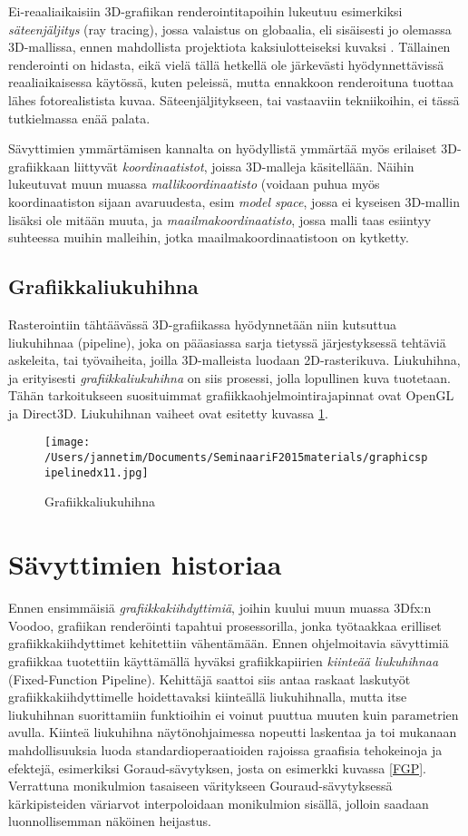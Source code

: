 \documentclass[finnish]{tktltiki2}
\theoremstyle{definition}
\theoremstyle{remark}
\begin{document}
Ei-reaaliaikaisiin 3D-grafiikan renderointitapoihin lukeutuu esimerkiksi \emph{säteenjäljitys} (ray tracing), jossa valaistus on globaalia, eli sisäisesti jo olemassa 3D-mallissa, ennen mahdollista projektiota kaksiulotteiseksi kuvaksi \cite{Puh08}. Tällainen renderointi on hidasta, eikä vielä tällä hetkellä ole järkevästi hyödynnettävissä reaaliaikaisessa käytössä, kuten peleissä, mutta ennakkoon renderoituna tuottaa lähes fotorealistista kuvaa. Säteenjäljitykseen, tai vastaaviin tekniikoihin, ei tässä tutkielmassa enää palata.

Sävyttimien ymmärtämisen kannalta on hyödyllistä ymmärtää myös erilaiset 3D-grafiikkaan liittyvät \emph{koordinaatistot}, joissa 3D-malleja käsitellään. Näihin lukeutuvat muun muassa \emph{mallikoordinaatisto} (voidaan puhua myös koordinaatiston sijaan avaruudesta, esim \emph{model space}, jossa ei kyseisen 3D-mallin lisäksi ole mitään muuta, ja \emph{maailmakoordinaatisto}, jossa malli taas esiintyy suhteessa muihin malleihin, jotka maailmakoordinaatistoon on kytketty.

\subsection{Grafiikkaliukuhihna}
Rasterointiin tähtäävässä 3D-grafiikassa hyödynnetään niin kutsuttua liukuhihnaa (pipeline), joka on pääasiassa sarja tietyssä järjestyksessä tehtäviä askeleita, tai työvaiheita, joilla 3D-malleista luodaan 2D-rasterikuva. Liukuhihna, ja erityisesti \emph{grafiikkaliukuhihna} on siis prosessi, jolla lopullinen kuva tuotetaan. Tähän tarkoitukseen suosituimmat grafiikkaohjelmointirajapinnat ovat OpenGL ja Direct3D. Liukuhihnan vaiheet ovat esitetty kuvassa \ref{gpipe}.

\begin{figure}[!htbp]
\centering
\texttt{[image: /Users/jannetim/Documents/SeminaariF2015materials/graphicspipelinedx11.jpg]}
\caption{Grafiikkaliukuhihna}
\label{gpipe}
\end{figure}

\section{Sävyttimien historiaa}

Ennen ensimmäisiä \emph{grafiikkakiihdyttimiä}, joihin kuului muun muassa 3Dfx:n Voodoo, grafiikan renderöinti tapahtui prosessorilla, jonka työtaakkaa erilliset grafiikkakiihdyttimet kehitettiin vähentämään. Ennen ohjelmoitavia sävyttimiä grafiikkaa tuotettiin käyttämällä hyväksi grafiikkapiirien \emph{kiinteää liukuhihnaa} (Fixed-Function Pipeline). Kehittäjä saattoi siis antaa raskaat laskutyöt grafiikkakiihdyttimelle hoidettavaksi kiinteällä liukuhihnalla, mutta itse liukuhihnan suorittamiin funktioihin ei voinut puuttua muuten kuin parametrien avulla. Kiinteä liukuhihna näytönohjaimessa nopeutti laskentaa ja toi mukanaan mahdollisuuksia luoda standardioperaatioiden rajoissa graafisia tehokeinoja ja efektejä, esimerkiksi Goraud-sävytyksen, josta on esimerkki kuvassa \ref{FGP}. Verrattuna monikulmion tasaiseen väritykseen Gouraud-sävytyksessä kärkipisteiden väriarvot interpoloidaan monikulmion sisällä, jolloin saadaan luonnollisemman näköinen heijastus.
\end{document}
